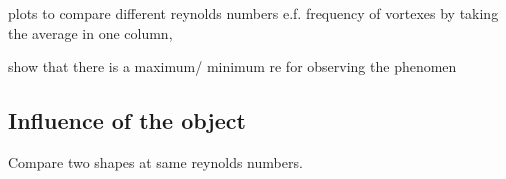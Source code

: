 plots to compare different reynolds numbers e.f. frequency of vortexes by taking the average in one column,

show that there is a maximum/ minimum re for observing the phenomen 


\subsection{Influence of the object}

Compare two shapes at same reynolds numbers. 
